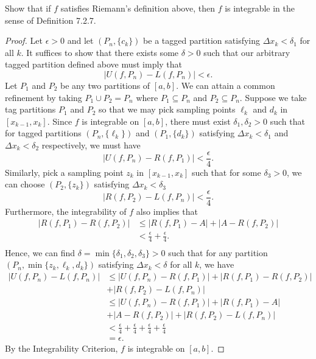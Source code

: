 Show that if \( f  \) satisfies Riemann's definition above, then \( f  \) is integrable in the sense of Definition 7.2.7.

\begin{proof}
Let \( \epsilon > 0  \) and let \( (P_n, \{ c_{k } \} ) \) be a tagged partition satisfying  \( \Delta x_{k} < \delta_1   \) for all  \( k \). It suffices to show that there exists some \( \delta > 0  \) such that our arbitrary tagged partition defined above must imply that
\[  | U(f, P_{n}) - L(f, P_{n}) | < \epsilon.  \]
Let \( P_{1} \) and \( P_{2} \) be any two partitions of \( [a,b]  \). We can attain a common refinement by taking \( P_{1} \cup P_{2} = P_{n} \) where \( P_{1} \subseteq P_{n} \) and \( P_{2} \subseteq P_{n} \). Suppose we take tag partitions \( P_{1} \) and \( P_{2} \) so that we may pick sampling points \( \ell_{k } \) and \( d_{ k }  \) in \( [x_{k-1} , x_{k}] \). Since \( f  \) is integrable on \( [a,b]  \), there must exist \( \delta_1, \delta_2  > 0  \) such that for tagged partitions \( (P_{n}, \{ \ell_k  \} )  \) and \( ( P_{1}, \{ d_{k } \} ) \) satisfying \( \Delta x_{k } < \delta_1  \) and \( \Delta x_{k } < \delta_2  \) respectively, we must have
\[  | U(f, P_{n}) - R(f, P_{1}) | < \frac{ \epsilon  }{ 4 }.\]
Similarly, pick a sampling point \( z_{k } \) in \( [x_{k-1}, x_{ k }] \) such that for some \( \delta_3 > 0  \), we can choose \( (P_{2}, \{ z_{k} \} ) \) satisfying \( \Delta x_{k } < \delta_3  \)
\[  | R(f, P_{2}) - L(f, P_{n}) | < \frac{ \epsilon  }{ 4 }.  \]
Furthermore, the integrability of \( f  \) also implies that 
\begin{align*}
	| R(f, P_{1}) - R(f,P_{2}) |   &\leq | R(f, P_{1}) - A  | + | A - R(f, P_{2}) | \\ 
								   &< \frac{ \epsilon }{ 4  } + \frac{ \epsilon  }{ 4  }.   \\
\end{align*}
Hence, we can find \( \delta = \min \{ \delta_{1}, \delta_{2}, \delta_{3}  \}  > 0  \) such that for any partition \( (P_{n}, \min \{ z_{k}, \ell_{k }, d_{k } \} ) \) satisfying \( \Delta x_{k } < \delta  \) for all \( k  \), we have
\begin{align*}
	| U(f, P_{n}) - L(f, P_{n}) | &\leq | U(f, P_{n}) - R(f, P_{1})   | + | R(f, P_{1}) - R(f, P_{2}) | \\ &+ | R(f,P_{2}) - L(f, P_{n}) |  \\
								  &\leq | U(f, P_{n}) - R(f, P_{1}) | + | R(f, P_{1}) - A | \\ &+  | A  - R(f, P_{2}) | + | R(f, P_{2}) - L(f, P_{n}) |  \\  
								  &< \frac{ \epsilon  }{ 4  } + \frac{ \epsilon  }{ 4  }  + \frac{ \epsilon  }{ 4  } + \frac{ \epsilon  }{ 4  } \\
								  &= \epsilon.
\end{align*}
By the Integrability Criterion, \( f  \) is integrable on \( [a,b] \).
\end{proof}


